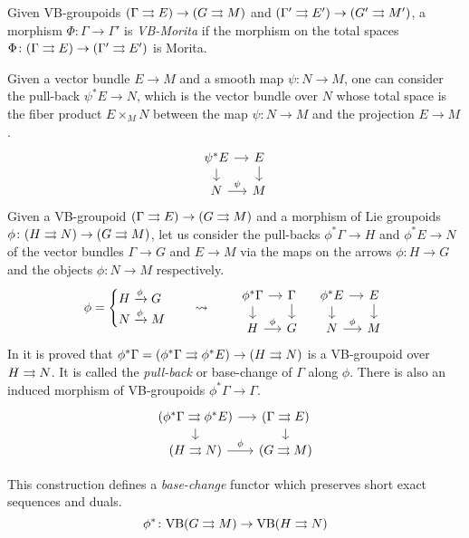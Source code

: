 %
%

Given VB-groupoids $(\Gamma\rightrightarrows E)\to (G\rightrightarrows M)$ and $(\Gamma'\rightrightarrows E')\to (G'\rightrightarrows M')$, a morphism $\Phi\colon \Gamma\to\Gamma'$ is \emph{VB-Morita} if the morphism on the total spaces $\Phi\colon (\Gamma\rightrightarrows E)\to (\Gamma'\rightrightarrows E')$ is Morita.

Given a vector bundle $E\to M$ and a smooth map $\psi\colon N\to M$, one can consider the pull-back $\psi^*E\to N$, which is the vector bundle over $N$ whose total space is the fiber product $E\times_M N$ between the map $\psi\colon N\to M$ and the projection $E\to M$.
\[\begin{tikzcd}[sep=1em]
  \psi^*E \ar{r} \ar{d} & E \ar{d} \\
  N \ar{r}{\psi} & M
\end{tikzcd}\]
Given a VB-groupoid $(\Gamma\rightrightarrows E)\to (G\rightrightarrows M)$ and a morphism of Lie groupoids $\phi\colon (H\rightrightarrows N)\to (G\rightrightarrows M)$,
let us consider the pull-backs $\phi^*\Gamma\to H$ and $\phi^*E\to N$ of the vector bundles $\Gamma\to G$ and $E\to M$ via the maps on the arrows $\phi\colon H \to G$ and the objects $\phi\colon N\to M$ respectively.
\[
\phi =
\begin{cases}
  H\xto{\phi} G \\
  N\xto{\phi} M
\end{cases}
\quad\leadsto\qquad
\begin{tikzcd}[sep=1em]
  \phi^*\Gamma \ar{r} \ar{d} & \Gamma \ar{d} \\
  H \ar{r}{\phi} & G
\end{tikzcd}
\quad
\begin{tikzcd}[sep=1em]
  \phi^*E \ar{r} \ar{d} & E \ar{d} \\
  N \ar{r}{\phi} & M
\end{tikzcd}\]
In \cite{bcdh16} it is proved that  $\phi^*\Gamma = (\phi^*\Gamma\rightrightarrows\phi^* E) \to (H\rightrightarrows N)$ is a VB-groupoid over $H\rightrightarrows N$.
It is called the \emph{pull-back} or base-change of $\Gamma$ along $\phi$.
There is also an induced morphism of VB-groupoids $\phi^*\Gamma\to\Gamma$.
\[\begin{tikzcd}[sep=small]
  (\phi^*\Gamma\tto\phi^*E) \ar{r} \ar{d} & (\Gamma\tto E) \ar{d} \\
  (H\tto N) \ar{r}{\phi} & (G\tto M)
\end{tikzcd}\]

This construction defines a \emph{base-change} functor which preserves short exact sequences and duals.
\[ \phi^*\colon\mathrm{VB}(G\rightrightarrows M) \to \mathrm{VB}(H\rightrightarrows N) \]

